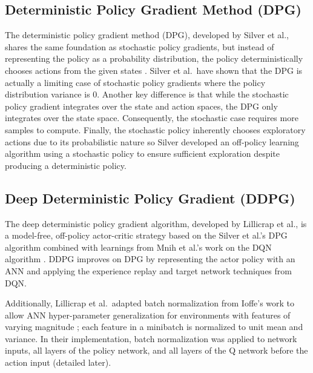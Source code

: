 \subsection{Deterministic Policy Gradient Method (DPG)}
The deterministic policy gradient method (DPG), developed by Silver et al., shares the same foundation as stochastic policy gradients, but instead of representing the policy as a probability distribution, the policy deterministically chooses actions from the given states \cite{silver_lever_heess_degris_wierstra_riedmiller}. Silver et al.\ have shown that the DPG is actually a limiting case of stochastic policy gradients where the policy distribution variance is 0. Another key difference is that while the stochastic policy gradient integrates over the state and action spaces, the DPG only integrates over the state space. Consequently, the stochastic case requires more samples to compute. Finally, the stochastic policy inherently chooses exploratory actions due to its probabilistic nature so Silver developed an off-policy learning algorithm using a stochastic policy to ensure sufficient exploration despite producing a deterministic policy.

\subsection{Deep Deterministic Policy Gradient (DDPG)}
The deep deterministic policy gradient algorithm, developed by Lillicrap et al., is a model-free, off-policy actor-critic strategy based on the Silver et al.'s DPG algorithm combined with learnings from Mnih et al.'s work on the DQN algorithm \cite{lillicrap_2016}\cite{Mnih_2015}\cite{silver_lever_heess_degris_wierstra_riedmiller}. DDPG improves on DPG by representing the actor policy with an ANN and applying the experience replay and target network techniques from DQN. 

Additionally, Lillicrap et al.\ adapted batch normalization from Ioffe's work to allow ANN hyper-parameter generalization for environments with features of varying magnitude \cite{2015arXiv150203167I}; each feature in a minibatch is normalized to unit mean and variance. In their implementation, batch normalization was applied to network inputs, all layers of the policy network, and all layers of the Q network before the action input (detailed later).

